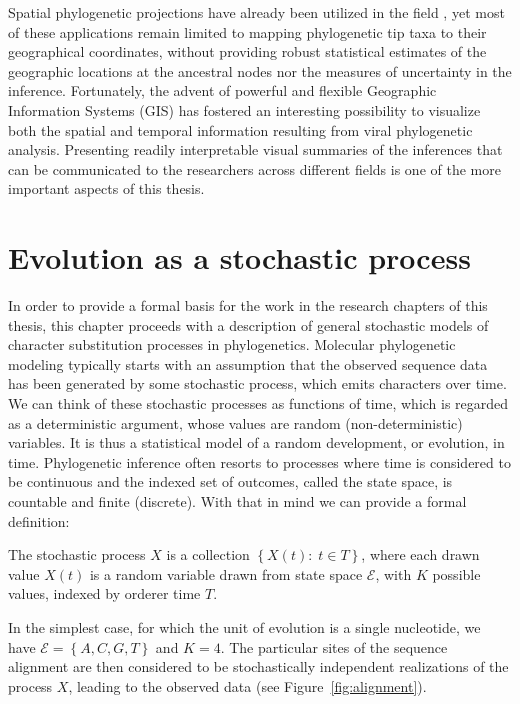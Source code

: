 Spatial phylogenetic projections have already been utilized in the field \citep{Kidd2006,Parks2009}, yet most of these applications remain limited to mapping phylogenetic tip taxa to their geographical coordinates, without providing robust statistical estimates of the geographic locations at the ancestral nodes nor the measures of uncertainty in the inference.
Fortunately, the advent of powerful and flexible Geographic Information Systems (GIS) has fostered an interesting possibility to visualize both the spatial and temporal information resulting from viral phylogenetic analysis.
Presenting readily interpretable visual summaries of the inferences that can be communicated to the researchers across different fields is one of the more important aspects of this thesis.

\section{Evolution as a stochastic process\label{sec:markov}}

In order to provide a formal basis for the work in the research chapters of this thesis, this chapter proceeds with a description of general stochastic models of character substitution processes in phylogenetics. 
Molecular phylogenetic modeling typically starts with an assumption that the observed sequence data has been generated by some stochastic process, which emits characters over time.
We can think of these stochastic processes as functions of time, which is regarded as a deterministic argument, whose values are random (non-deterministic) variables. 
It is thus a statistical model of a random development, or evolution, in time.
Phylogenetic inference often resorts to processes where time is considered to be continuous and the indexed set of outcomes, called the state space, is countable and finite (discrete).
With that in mind we can provide a formal definition:

\begin{definition} 
The stochastic process $X$ is a collection $\left\{ X(t):\; t\in T\right\} $, where each drawn value $X(t)$ is a random variable drawn from state space $\mathcal{E}$, with $K$ possible values, indexed by orderer time $T$.
\label{def:stochasticProc}
\end{definition} 

In the simplest case, for which the unit of evolution is a single nucleotide, we have $\mathcal{E}=\left\{ A,C,G,T\right\}$ and $K=4$.
The particular sites of the sequence alignment are then considered to be stochastically independent realizations of the process $X$, leading to the observed data (see Figure~\ref{fig:alignment}). 


